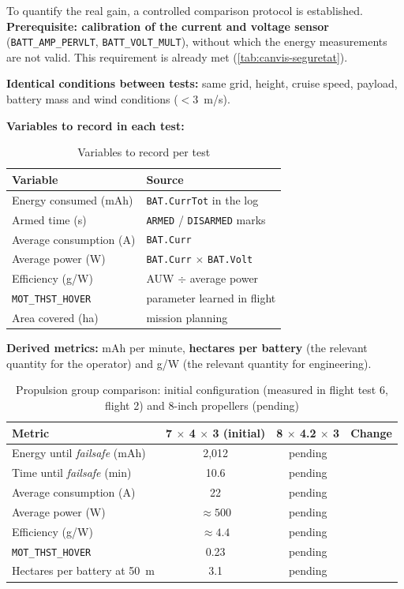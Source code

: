 To quantify the real gain, a controlled comparison protocol is established. \textbf{Prerequisite: calibration of the current and voltage sensor} (\texttt{BATT\_AMP\_PERVLT}, \texttt{BATT\_VOLT\_MULT}), without which the energy measurements are not valid. This requirement is already met (\cref{tab:canvis-seguretat}).

\textbf{Identical conditions between tests:} same grid, height, cruise speed, payload, battery mass and wind conditions ($< 3$~m/s).

\textbf{Variables to record in each test:}

\begin{table}[H]
    \centering
    \caption{Variables to record per test}
    \label{tab:variables-mesura}
    \begin{tabular}{ll}
        \toprule
        Variable & Source \\
        \midrule
        Energy consumed (mAh) & \texttt{BAT.CurrTot} in the log \\
        Armed time (s) & \texttt{ARMED} / \texttt{DISARMED} marks \\
        Average consumption (A) & \texttt{BAT.Curr} \\
        Average power (W) & \texttt{BAT.Curr} $\times$ \texttt{BAT.Volt} \\
        Efficiency (g/W) & AUW $\div$ average power \\
        \texttt{MOT\_THST\_HOVER} & parameter learned in flight \\
        Area covered (ha) & mission planning \\
        \bottomrule
    \end{tabular}
\end{table}

\textbf{Derived metrics:} mAh per minute, \textbf{hectares per battery} (the relevant quantity for the operator) and g/W (the relevant quantity for engineering).

\begin{table}[H]
    \centering
    \caption{Propulsion group comparison: initial configuration (measured in flight test 6, flight 2) and 8-inch propellers (pending)}
    \label{tab:resultats-propulsor}
    \begin{tabular}{lccc}
        \toprule
        Metric & 7 $\times$ 4 $\times$ 3 (initial) & 8 $\times$ 4.2 $\times$ 3 & Change \\
        \midrule
        Energy until \emph{failsafe} (mAh) & 2,012 & pending & \\
        Time until \emph{failsafe} (min) & 10.6 & pending & \\
        Average consumption (A) & 22 & pending & \\
        Average power (W) & $\approx 500$ & pending & \\
        Efficiency (g/W) & $\approx 4.4$ & pending & \\
        \texttt{MOT\_THST\_HOVER} & 0.23 & pending & \\
        Hectares per battery at 50~m & 3.1 & pending & \\
        \bottomrule
    \end{tabular}
\end{table}

